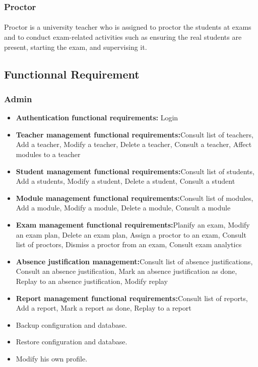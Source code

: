 \documentclass[]{uc2pfecaneva}
\begin{document}
    \raggedright\subsubsection{Proctor}
    \justifying\paragraph{}
    Proctor is a university teacher who is assigned to proctor the students at exams and to conduct exam-related activities such as ensuring the real students are present, starting the exam, and supervising it.

    \raggedright\subsection{Functionnal Requirement}
    \subsubsection{Admin}
    \begin{itemize}
        \item{\textbf{Authentication functional requirements:} Login}
        \item{\textbf{Teacher management functional requirements:}Consult list of teachers, Add a teacher, Modify a teacher, Delete a teacher, Consult a teacher, Affect modules to a teacher}
        \item{\textbf{Student management functional requirements:}Consult list of students, Add a students, Modify a student, Delete a student, Consult a student}
        \item{\textbf{Module management functional requirements:}Consult list of modules, Add a module, Modify a module, Delete a module, Consult a module}
        \item{\textbf{Exam management functional requirements:}Planify an exam, Modify an exam plan, Delete an exam plan, Assign a proctor to an exam, Consult list of proctors, Dismiss a proctor from an exam, Consult exam analytics}
        \item{\textbf{Absence justification management:}Consult list of absence justifications, Consult an absence justification, Mark an absence justification as done, Replay to an absence justification, Modify replay}
        \item{\textbf{Report management functional requirements:}Consult list of reports, Add a report, Mark a report as done, Replay to a report}
        \item Backup configuration and database.
        \item Restore configuration and database.
        \item Modify his own profile.
    \end{itemize}
\end{document}
